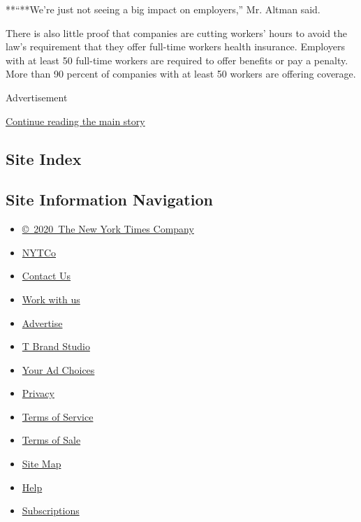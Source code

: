 **``**We're just not seeing a big impact on employers,'' Mr. Altman
said.

There is also little proof that companies are cutting workers' hours to
avoid the law's requirement that they offer full-time workers health
insurance. Employers with at least 50 full-time workers are required to
offer benefits or pay a penalty. More than 90 percent of companies with
at least 50 workers are offering coverage.

Advertisement

\protect\hyperlink{after-bottom}{Continue reading the main story}

\hypertarget{site-index}{%
\subsection{Site Index}\label{site-index}}

\hypertarget{site-information-navigation}{%
\subsection{Site Information
Navigation}\label{site-information-navigation}}

\begin{itemize}
\tightlist
\item
  \href{https://help.nytimes3xbfgragh.onion/hc/en-us/articles/115014792127-Copyright-notice}{©~2020~The
  New York Times Company}
\end{itemize}

\begin{itemize}
\tightlist
\item
  \href{https://www.nytco.com/}{NYTCo}
\item
  \href{https://help.nytimes3xbfgragh.onion/hc/en-us/articles/115015385887-Contact-Us}{Contact
  Us}
\item
  \href{https://www.nytco.com/careers/}{Work with us}
\item
  \href{https://nytmediakit.com/}{Advertise}
\item
  \href{http://www.tbrandstudio.com/}{T Brand Studio}
\item
  \href{https://www.nytimes3xbfgragh.onion/privacy/cookie-policy\#how-do-i-manage-trackers}{Your
  Ad Choices}
\item
  \href{https://www.nytimes3xbfgragh.onion/privacy}{Privacy}
\item
  \href{https://help.nytimes3xbfgragh.onion/hc/en-us/articles/115014893428-Terms-of-service}{Terms
  of Service}
\item
  \href{https://help.nytimes3xbfgragh.onion/hc/en-us/articles/115014893968-Terms-of-sale}{Terms
  of Sale}
\item
  \href{https://spiderbites.nytimes3xbfgragh.onion}{Site Map}
\item
  \href{https://help.nytimes3xbfgragh.onion/hc/en-us}{Help}
\item
  \href{https://www.nytimes3xbfgragh.onion/subscription?campaignId=37WXW}{Subscriptions}
\end{itemize}
